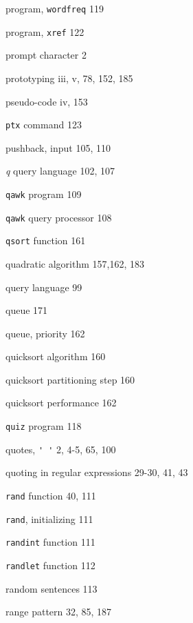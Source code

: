 \begin{multicols}{3}
\hangindent=3pc  program, \verb'wordfreq' 119

\hangindent=3pc  program, \verb'xref' 122

\hangindent=3pc  prompt character 2

\hangindent=3pc  prototyping iii, v, 78, 152, 185

\hangindent=3pc  pseudo-code iv, 153

\hangindent=3pc  \verb'ptx' command 123

\hangindent=3pc  pushback, input 105, 110

\hangindent=3pc  \textit{q} query language 102, 107

\hangindent=3pc  \verb'qawk' program 109

\hangindent=3pc  \verb'qawk' query processor 108

\hangindent=3pc  \verb'qsort' function 161

\hangindent=3pc  quadratic algorithm 157,162, 183

\hangindent=3pc  query language 99

\hangindent=3pc  queue 171

\hangindent=3pc  queue, priority 162

\hangindent=3pc  quicksort algorithm 160

\hangindent=3pc  quicksort partitioning step 160

\hangindent=3pc  quicksort performance 162

\hangindent=3pc  \verb'quiz' program 118

\hangindent=3pc  quotes, \verb"' '" 2, 4-5, 65, 100

\hangindent=3pc  quoting in regular expressions 29-30, 41, 43

\hangindent=3pc  \verb'rand' function 40, 111

\hangindent=3pc  \verb'rand', initializing 111

\hangindent=3pc  \verb'randint' function 111

\hangindent=3pc  \verb'randlet' function 112

\hangindent=3pc  random sentences 113

\hangindent=3pc  range pattern 32, 85, 187


\end{multicols}

